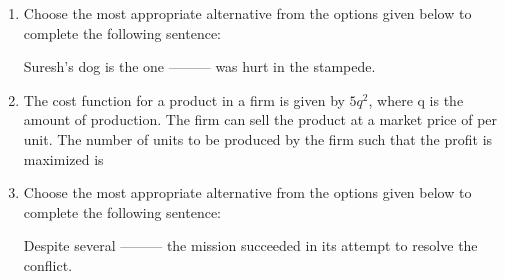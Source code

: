 \documentclass[journal,11pt,onecolumn]{IEEEtran}
\begin{document}
\begin{enumerate}[resume]

    \item Choose the most appropriate alternative from the options given below to complete the following sentence:

          Suresh's dog is the one --------– was hurt in the stampede.

          \begin{enumerate}
          \end{enumerate}

    \item The cost function for a product in a firm is given by \(5q^2\), where q is the amount of production. The firm can sell the product at a market price of  per unit. The number of units to be produced by the firm such that the profit is maximized is

          \begin{enumerate}
          \end{enumerate}

    \item Choose the most appropriate alternative from the options given below to complete the following sentence:

          Despite several --------– the mission succeeded in its attempt to resolve the conflict.

          \begin{enumerate}
          \end{enumerate}


\end{enumerate}
\end{document}
